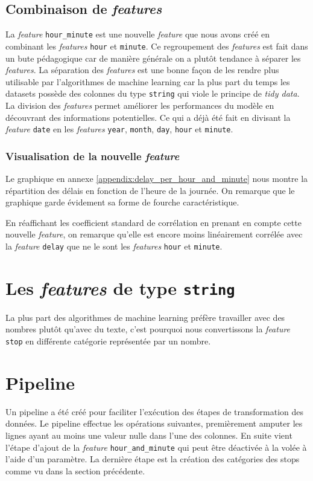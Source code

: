 \subsection{Combinaison de \textit{features}}
La \textit{feature} \lstinline!hour_minute! est une nouvelle \textit{feature} que nous avons créé en combinant les \textit{features} \lstinline!hour! et \lstinline!minute!. Ce regroupement des \textit{features} est fait dans un bute pédagogique car de manière générale on a plutôt tendance à séparer les \textit{features}. La séparation des \textit{features} est une bonne façon de les rendre plus utilisable par l'algorithmes de machine learning car la plus part du temps les datasets possède des colonnes du type \lstinline!string! qui viole le principe de \textit{tidy data}. La division des \textit{features} permet améliorer les performances du modèle en découvrant des informations potentielles. Ce qui a déjà été fait en divisant la \textit{feature} \lstinline!date! en les \textit{features} \lstinline!year!, \lstinline!month!, \lstinline!day!, \lstinline!hour! et \lstinline!minute!.

\subsubsection{Visualisation de la nouvelle \textit{feature}}
Le graphique en annexe \ref{appendix:delay_per_hour_and_minute} nous montre la répartition des délais en fonction de l'heure de la journée. On remarque que le graphique garde évidement sa forme de fourche caractéristique.

En réaffichant les coefficient standard de corrélation en prenant en compte cette nouvelle \textit{feature}, on remarque qu'elle est encore moins linéairement corrélée avec la \textit{feature} \lstinline!delay! que ne le sont les \textit{features} \lstinline!hour! et \lstinline!minute!.

\section{Les \textit{features} de type \lstinline!string!}
La plus part des algorithmes de machine learning préfère travailler avec des nombres plutôt qu'avec du texte, c'est pourquoi nous convertissons la \textit{feature} \lstinline!stop! en différente catégorie représentée par un nombre.

\section{Pipeline}
Un pipeline a été créé pour faciliter l'exécution des étapes de transformation des données. Le pipeline effectue les opérations suivantes, premièrement amputer les lignes ayant au moins une valeur nulle dans l'une des colonnes. En suite vient l'étape d'ajout de la \textit{feature} \lstinline!hour_and_minute! qui peut être déactivée à la volée à l'aide d'un paramètre. La dernière étape est la création des catégories des stops comme vu dans la section précédente.